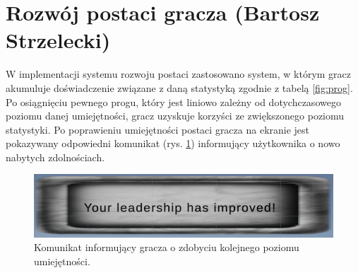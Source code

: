 \section{Rozwój postaci gracza (Bartosz Strzelecki)}\label{s:impl_progres}
W implementacji systemu rozwoju postaci zastosowano system, w którym gracz akumuluje doświadczenie związane z daną statystyką
zgodnie z tabelą \ref{fig:prog}. Po osiągnięciu pewnego progu, który jest liniowo zależny od dotychczasowego poziomu danej umiejętności,
gracz uzyskuje korzyści ze zwiększonego poziomu statystyki. Po poprawieniu umiejętności postaci gracza na ekranie jest pokazywany odpowiedni
komunikat (rys. \ref{fig:modal}) informujący użytkownika o nowo nabytych zdolnościach.


\begin{figure}[htbp]
    \centering
    \includegraphics[width=1.0\textwidth]{images/modal}
    \caption{Komunikat informujący gracza o zdobyciu kolejnego poziomu umiejętności.}\label{fig:modal}
\end{figure}
